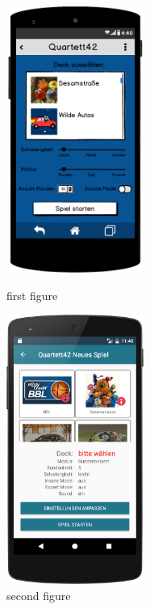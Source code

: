 \begin{figure}[h]
    \centering
    \begin{minipage}{0.45\textwidth}
        \centering
        \includegraphics[width=0.4\textwidth]{img/mockups/neues_spiel.png}
        \caption{first figure}
    \end{minipage}\hfill
    \begin{minipage}{0.45\textwidth}
        \centering
        \includegraphics[width=0.4\textwidth]{img/screenshots/device_new_game.png}
        \caption{second figure}
    \end{minipage}
\end{figure}

